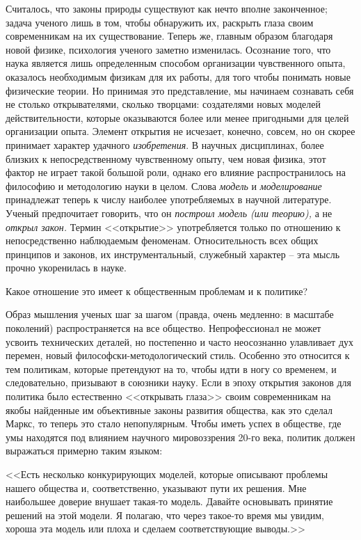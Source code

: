 \documentclass{book}
\begin{document}
Считалось, что законы природы существуют как нечто вполне законченное; задача ученого лишь в том, чтобы обнаружить их, раскрыть глаза своим современникам на их существование. Теперь же, главным образом благодаря новой физике, психо­логия ученого заметно изменилась. Осознание того, что наука является лишь определенным способом организации чувственного опыта, оказалось необходимым физикам для их работы, для того чтобы понимать новые физические теории. Но прини­мая это представление, мы начинаем сознавать себя не столько открывателями, сколько творцами: создателями новых моде­лей действительности, которые оказываются более или менее пригодными для целей организации опыта. Элемент открытия не исчезает, конечно, совсем, но он скорее принимает характер удачного \textit{изобретения}.  В научных дисциплинах, более близких к непосредственному чувственному опыту, чем новая физика, этот фактор не играет такой большой роли, однако его влияние распространилось на философию и методологию науки в целом. Слова \textit{модель}  и \textit{моделирование}  принадлежат теперь к числу наиболее употребляемых в научной литературе. Ученый пред­почитает говорить, что он \textit{построил модель (или теорию),}  а не \textit{открыл закон.}  Термин <<открытие>> употребляется только по от­ношению к непосредственно наблюдаемым феноменам. Относи­тельность всех общих принципов и законов, их инструменталь­ный, служебный характер -- эта мысль прочно укоренилась в науке.

Какое отношение это имеет к общественным проблемам и к политике?

Образ мышления ученых шаг за шагом (правда, очень мед­ленно: в масштабе поколений) распространяется на все общест­во. Непрофессионал не может усвоить технических деталей, но постепенно и часто неосознанно улавливает дух перемен, новый философски-методологический стиль. Особенно это относится к тем политикам, которые претендуют на то, чтобы идти в ногу со временем, и следовательно, призывают в союзники науку. Если в эпоху открытия законов для политика было естественно <<открывать глаза>> своим современникам на якобы найден­ные им объективные законы развития общества, как это сделал Маркс, то теперь это стало непопулярным. Чтобы иметь успех в обществе, где умы находятся под влиянием научного мировоззрения 20-го века, политик должен выражаться примерно таким языком:

<<Есть несколько конкурирующих моделей, которые описы­вают проблемы нашего общества и, соответственно, указывают пути их решения. Мне наибольшее доверие внушает такая-то модель. Давайте основывать принятие решений на этой модели. Я полагаю, что через такое-то время мы увидим, хороша эта модель или плоха и сделаем соответствующие выводы.>>
\end{document}
